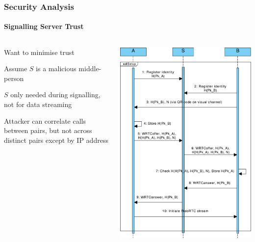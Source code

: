 \documentclass[handout, notes=hide]{beamer}
\begin{document}

\begin{frame}
\frametitle{Security Analysis}
\framesubtitle{Signalling Server Trust}

\begin{columns}[T]
\begin{column}[T]{0.6\textwidth}
\setlength{\parskip}{0.5em}

Want to minimise trust

Assume $S$ is a malicious middle-person

$S$ only needed during signalling, not for data streaming

Attacker can correlate calls between pairs, but not across distinct pairs except by IP address

\end{column}
\begin{column}[T]{0.4\textwidth}
\includegraphics[width=1.0\textwidth]{core-qr-thin}
\end{column}
\end{columns}
\end{frame}
\end{document}
